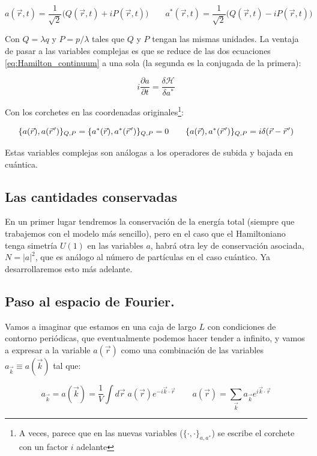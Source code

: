 \begin{equation}
	a(\vec r,t)=\frac{1}{\sqrt{2}}\big(Q(\vec r,t)+iP(\vec r,t)\big) \qquad a^*(\vec r,t)=\frac{1}{\sqrt{2}}\big(Q(\vec r,t)-iP(\vec r,t)\big)
\end{equation}

Con $Q=\lambda q$ y $P=p / \lambda$ tales que $Q$ y $P$ tengan las mismas unidades. La ventaja de pasar a las variables complejas es que se reduce de las dos ecuaciones \eqref{eq:Hamilton_continuum} a una sola (la segunda es la conjugada de la primera):

\begin{equation}
	i\frac{\partial a}{\partial t} = \frac{\delta \mathcal{H}}{\delta a^*}
\end{equation}

Con los corchetes en las coordenadas originales\footnote{A veces, parece que en las nuevas variables ($\{\cdot,\cdot\}_{a,a^*}$) se escribe el corchete con un factor $i$ adelante}:

\begin{equation}
	\{a(\vec r), a(\pvec r')\}_{Q,P} = \{a^*(\vec r), a^*(\pvec r')\}_{Q,P} = 0 \qquad \{a(\vec r), a^*(\pvec r')\}_{Q,P} = i\delta(\vec r - \pvec r')
\end{equation}

Estas variables complejas son análogas a los operadores de subida y bajada en cuántica. 

\subsection*{Las cantidades conservadas}
En un primer lugar tendremos la conservación de la energía total (siempre que trabajemos con el modelo más sencillo), pero en el caso que el Hamiltoniano tenga simetría $U(1)$ en las variables $a$, habrá otra ley de conservación asociada, $N=|a|^2$, que es análogo al número de partículas en el caso cuántico. Ya desarrollaremos esto más adelante. 

\subsection*{Paso al espacio de Fourier.}
Vamos a imaginar que estamos en una caja de largo $L$ con condiciones de contorno periódicas, que eventualmente podemos hacer tender a infinito, y vamos a expresar a la variable $a(\vec r)$ como una combinación de las variables $a_{\vec k} \equiv a(\vec k)$ tal que:

\begin{equation}
	a_{\vec k} = a(\vec k) = \frac{1}{V}\int d\vec r\;a(\vec r)e^{-i\vec k\cdot\vec r} \qquad a(\vec r) = \sum_{\vec k} a_{\vec k} e^{i\vec k\cdot\vec r}
\end{equation}

